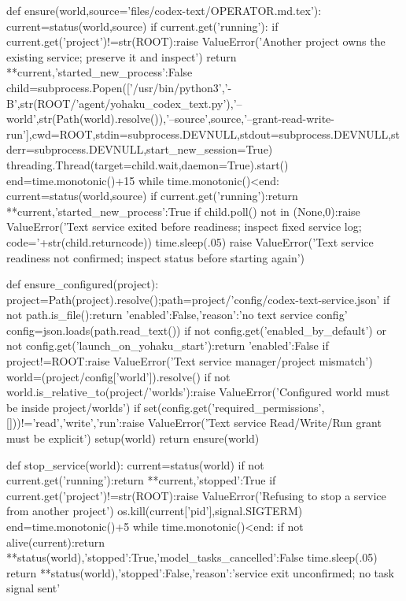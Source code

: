 def ensure(world,source='files/codex-text/OPERATOR.md.tex'):
    current=status(world,source)
    if current.get('running'):
        if current.get('project')!=str(ROOT):raise ValueError('Another project owns the existing service; preserve it and inspect')
        return {**current,'started_new_process':False}
    child=subprocess.Popen(['/usr/bin/python3','-B',str(ROOT/'agent/yohaku_codex_text.py'),'--world',str(Path(world).resolve()),'--source',source,'--grant-read-write-run'],cwd=ROOT,stdin=subprocess.DEVNULL,stdout=subprocess.DEVNULL,stderr=subprocess.DEVNULL,start_new_session=True)
    threading.Thread(target=child.wait,daemon=True).start()
    end=time.monotonic()+15
    while time.monotonic()<end:
        current=status(world,source)
        if current.get('running'):return {**current,'started_new_process':True}
        if child.poll() not in (None,0):raise ValueError('Text service exited before readiness; inspect fixed service log; code='+str(child.returncode))
        time.sleep(.05)
    raise ValueError('Text service readiness not confirmed; inspect status before starting again')

def ensure_configured(project):
    project=Path(project).resolve();path=project/'config/codex-text-service.json'
    if not path.is_file():return {'enabled':False,'reason':'no text service config'}
    config=json.loads(path.read_text())
    if not config.get('enabled_by_default') or not config.get('launch_on_yohaku_start'):return {'enabled':False}
    if project!=ROOT:raise ValueError('Text service manager/project mismatch')
    world=(project/config['world']).resolve()
    if not world.is_relative_to(project/'worlds'):raise ValueError('Configured world must be inside project/worlds')
    if set(config.get('required_permissions',[]))!={'read','write','run'}:raise ValueError('Text service Read/Write/Run grant must be explicit')
    setup(world)
    return ensure(world)

def stop_service(world):
    current=status(world)
    if not current.get('running'):return {**current,'stopped':True}
    if current.get('project')!=str(ROOT):raise ValueError('Refusing to stop a service from another project')
    os.kill(current['pid'],signal.SIGTERM)
    end=time.monotonic()+5
    while time.monotonic()<end:
        if not alive(current):return {**status(world),'stopped':True,'model_tasks_cancelled':False}
        time.sleep(.05)
    return {**status(world),'stopped':False,'reason':'service exit unconfirmed; no task signal sent'}

